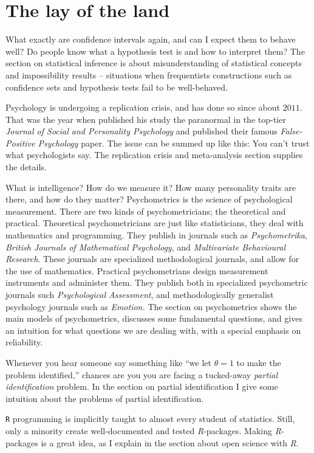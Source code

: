 \section{The lay of the land}

What exactly are confidence intervals again, and can I expect them to behave well? Do people know what a hypothesis test is and how to interpret them? The section on statistical inference is about misunderstanding of statistical concepts and impossibility results -- situations when frequentists constructions such as confidence sets and hypothesis tests fail to be well-behaved. 

Psychology is undergoing a replication crisis, and has done so since about $2011$. That was the year when \textcite{Bem2011-vq} published his study the paranormal in the top-tier \textit{Journal of Social and Personality Psychology} and \textcite{simmons_false-positive_2011} published their famous \textit{False-Positive Psychology} paper. The issue can be summed up like this: You can't trust what psychologists say. The replication crisis and meta-analysis section supplies the details.

What is intelligence? How do we measure it? How many personality traits are there, and how do they matter? Psychometrics is the science of psychological measurement. There are two kinds of psychometricians; the theoretical and practical. Theoretical psychometricians are just like statisticians, they deal with mathematics and programming. They publish in journals such as \textit{Psychometrika}, \textit{British Journals of Mathematical Psychology}, and \textit{Multivariate Behavioural Research}. These journals are specialized methodological journals, and allow for the use of mathematics. Practical psychometrians design measurement instruments and administer them. They publish both in specialized psychometric journals such \textit{Psychological Assessment}, and methodologically generalist psychology journals such as \textit{Emotion.} The section on psychometrics shows the main models of psychometrics, discusses some fundamental questions, and gives an intuition for what questions we are dealing with, with a special emphasis on reliability.

Whenever you hear someone say something like ``we let $\theta=1$ to make the problem identified,'' chances are you you are facing a tucked-away \textit{partial identification} problem. In the section on partial identification I give some intuition about the problems of partial identification.

\texttt{R} programming is implicitly taught to almost every student of statistics. Still, only a minority create well-documented and tested \textit{R}-packages. Making \textit{R}-packages is a great idea, as I explain in the section about open science with \textit{R}.
